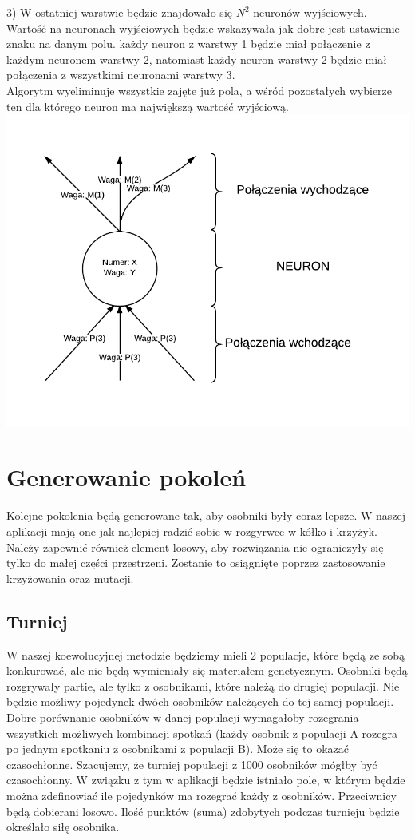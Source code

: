 \documentclass[paper=a4, fontsize=11pt]{scrartcl} %
\numberwithin{equation}{section} %
\numberwithin{figure}{section} %
\numberwithin{table}{section} %
\begin{document}
3) W ostatniej warstwie będzie znajdowało się $N^2$ neuronów wyjściowych. Wartość na neuronach wyjściowych będzie wskazywała jak dobre jest ustawienie znaku na danym polu. 
każdy neuron z warstwy 1 będzie miał połączenie z każdym neuronem warstwy 2, natomiast każdy neuron warstwy 2 będzie miał połączenia z wszystkimi neuronami warstwy 3. \\
Algorytm wyeliminuje wszystkie zajęte już pola, a wśród pozostałych wybierze ten dla którego neuron ma największą wartość wyjściową. \\
\includegraphics[scale=1]{diagrams/CoevolutionaryTicTacToe4} \\

\section{Generowanie pokoleń}
Kolejne pokolenia będą generowane tak, aby osobniki były coraz lepsze. W naszej aplikacji mają one jak najlepiej radzić sobie w rozgyrwce w kółko i krzyżyk. Należy zapewnić również element losowy, aby rozwiązania nie ograniczyły się tylko do małej części przestrzeni. Zostanie to osiągnięte poprzez zastosowanie krzyżowania oraz mutacji. 

\subsection{Turniej}
W naszej koewolucyjnej metodzie będziemy mieli 2 populacje, które będą ze sobą konkurować, ale nie będą wymieniały się materiałem genetycznym. Osobniki będą rozgrywały partie, ale tylko z osobnikami, które należą do drugiej populacji. Nie będzie możliwy pojedynek dwóch osobników należących do tej samej populacji. Dobre porównanie osobników w danej populacji wymagałoby rozegrania wszystkich możliwych kombinacji spotkań (każdy osobnik z populacji A rozegra po jednym spotkaniu z osobnikami z populacji B). Może się to okazać czasochłonne. Szacujemy, że turniej populacji z 1000 osobników mógłby być czasochłonny. W związku z tym w aplikacji będzie istniało pole, w którym będzie można zdefinowiać ile pojedynków ma rozegrać każdy z osobników. Przeciwnicy będą dobierani losowo. Ilość punktów (suma) zdobytych podczas turnieju będzie określało siłę osobnika.
\end{document}

